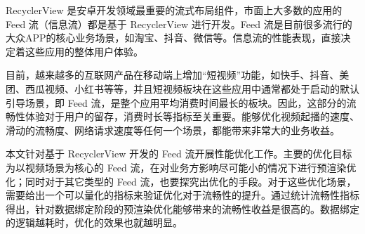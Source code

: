 RecyclerView 是安卓开发领域最重要的流式布局组件，市面上大多数的应用的 Feed 流（信息流）都是基于 RecyclerView 进行开发。Feed 流是目前很多流行的大众APP的核心业务场景，如淘宝、抖音、微信等。信息流的性能表现，直接决定着这些应用的整体用户体验。

目前，越来越多的互联网产品在移动端上增加“短视频”功能，如快手、抖音、美团、西瓜视频、小红书等等，并且短视频板块在这些应用中通常都处于启动的默认引导场景，即 Feed 流，是整个应用平均消费时间最长的板块。因此，这部分的流畅性体验对于用户的留存，消费时长等指标至关重要。能够优化视频起播的速度、滑动的流畅度、网络请求速度等任何一个场景，都能带来非常大的业务收益。

本文针对基于 RecyclerView 开发的 Feed 流开展性能优化工作。主要的优化目标为以视频场景为核心的 Feed 流，在对业务方影响尽可能小的情况下进行预渲染优化；同时对于其它类型的 Feed 流，也要探究出优化的手段。对于这些优化场景，需要给出一个可以量化的指标来验证优化对于流畅性的提升。通过统计流畅性指标得出，针对数据绑定阶段的预渲染优化能够带来的流畅性收益是很高的。数据绑定的逻辑越耗时，优化的效果也就越明显。






